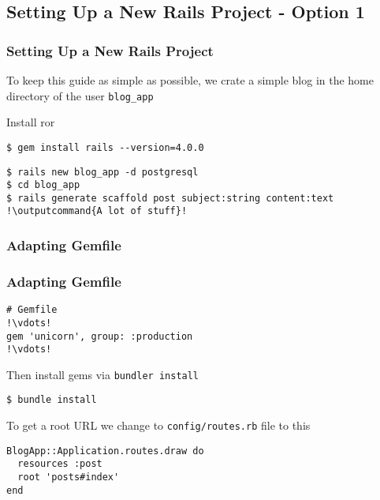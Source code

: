 \subsection{Setting Up a New Rails Project - Option 1}
\begin{frame}[fragile]
\frametitle{Setting Up a New Rails Project}
To keep this guide as simple as possible, we crate a simple blog in the home directory of the user \texttt{blog\_app}

Install \acrshort{ror}

\lstset{language=shell, escapechar=!}
\begin{lstlisting}[escapechar=!]
$ gem install rails --version=4.0.0
\end{lstlisting}

\lstset{language=shell, escapechar=!}
\begin{lstlisting}[escapechar=!]
$ rails new blog_app -d postgresql
$ cd blog_app
$ rails generate scaffold post subject:string content:text
!\outputcommand{A lot of stuff}!
\end{lstlisting}

\end{frame}
\subsubsection{Adapting Gemfile}
\begin{frame}[fragile]
\frametitle{Adapting Gemfile}
\lstset{language=Ruby, style=eclipse}
\begin{lstlisting}[escapechar=!]
# Gemfile
!\vdots!
gem 'unicorn', group: :production
!\vdots!
\end{lstlisting}

Then install gems via \texttt{bundler install}

\lstset{language=shell, escapechar=!}
\begin{lstlisting}[escapechar=!]
$ bundle install
\end{lstlisting}
 
To get a root URL we change to \texttt{config/routes.rb} file to this
\lstset{language=Ruby, style=eclipse}
\begin{lstlisting}
BlogApp::Application.routes.draw do
  resources :post
  root 'posts#index'
end
\end{lstlisting}
\end{frame}
